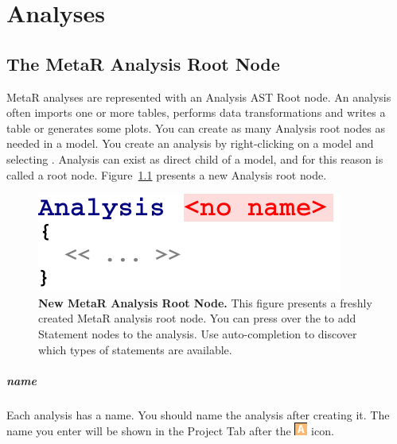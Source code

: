 


\chapter{Analyses}\label{chap:Analyses}


\section{The MetaR Analysis Root Node}
MetaR analyses are represented with an Analysis AST Root node. An analysis often imports one or more tables, performs data transformations and writes a table or generates some plots. 
You can create as many Analysis root nodes as needed in a model. You create an analysis by right-clicking on a model and selecting . Analysis can exist as direct child of a model, and for this reason is called a root node. Figure~\ref{fig:NewAnalysis} presents a new Analysis root node. 

\begin{figure}
  \centering
  \includegraphics[width=\figWidthTiny]{figures/NewAnalysis.pdf}
\caption[New MetaR Analysis Root Node.]{\textbf{New MetaR Analysis Root Node.} This figure presents a freshly created MetaR analysis root node. You can press \keys{\return} over the \mpsplaceholder{} to add Statement nodes to the analysis. Use auto-completion to discover which types of statements are available. }
\label{fig:NewAnalysis}
\end{figure}

\paragraph{name}
Each analysis has a name. You should name the analysis after creating it. The name you enter will be shown in the Project Tab after the \includegraphics[height={2ex}]{figures/analysis.png} icon.

